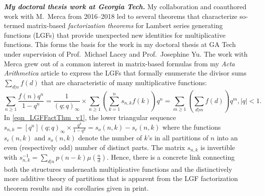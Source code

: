 \documentclass[10pt,reqno,letterpaper]{article}
\theoremstyle{plain}
\numberwithin{theorem}{section}
\theoremstyle{definition}
\begin{document}
\vskip -0.5mm
\noindent
{\normalsize \textbf{\emph{My doctoral thesis work at Georgia Tech.}}} 
My collaboration and coauthored work with M.~Merca from 2016--2018 
led to several theorems that characterize 
so-termed matrix-based \emph{factorization theorems} for Lambert series generating functions (LGFs) 
that provide unexpected new identities for multiplicative functions. 
This forms the basis for the work in my doctoral thesis 
at GA Tech under supervision of Prof.~Michael Lacey and Prof.~Josephine Yu. 
The work with Merca grew out of a common interest in matrix-based formulas from my 
\emph{Acta Arithmetica} article \cite{MDS-NO-7} to express the 
LGFs that formally enumerate the divisor sums $\sum_{d|n} f(d)$ that are characteristic of many 
multiplicative functions: 
\begin{equation}
\label{eqn_LGFFactThm_v1} 
\sum_{n \geq 1} \frac{f(n)q^n}{1-q^n} = \frac{1}{(q; q)_{\infty}} \times \sum_{n \geq 1} \left( 
     \sum_{k=1}^{n} s_{n,k} f(k)\right) q^n = 
     \sum_{m \geq 1} \left(\sum_{d|m} f(d)\right) q^m, |q| < 1. 
\end{equation}
In \eqref{eqn_LGFFactThm_v1}, the lower triangular sequence 
$s_{n,k} = [q^n](q; q)_{\infty} \times \frac{q^k}{1-q^k} = s_o(n, k) - s_e(n, k)$ where 
the functions $s_e(n, k)$ and $s_o(n, k)$ denote the number of $k$'s in all 
partitions of $n$ into an even (respectively odd) number of distinct parts. The matrix $s_{n,k}$ is 
invertible with $s_{n,k}^{-1} = \sum_{d|n} p(n-k) \mu\left(\frac{n}{d}\right)$. 
Hence, there is a concrete link connecting both the structures underneath 
multiplicative functions and the distinctively more additive theory of partitions that is 
apparent from the LGF factorization theorem results and its corollaries given in print. 
\end{document}
